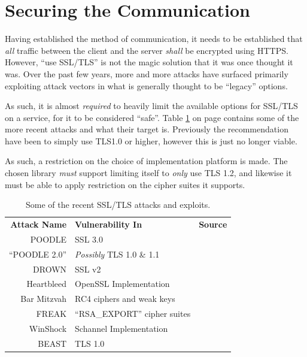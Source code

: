 	\section{Securing the Communication}
		\label{sec:design:secure-comms}
		Having established the method of communication, it needs to be established that \emph{all} traffic between the client and the server \emph{shall} be encrypted using HTTPS. However, ``use SSL/TLS'' is not the magic solution that it was once thought it was. Over the past few years, more and more attacks have surfaced primarily exploiting attack vectors in what is generally thought to be ``legacy'' options.

		As such, it is almost \emph{required} to heavily limit the available options for SSL/TLS on a service, for it to be considered ``safe''. Table \ref{table:ssl/tls} on page \pageref{table:ssl/tls} contains some of the more recent attacks and what their target is. Previously the recommendation have been to simply use TLS1.0 or higher\cite{ms_tls1.0+}, however this is just no longer viable. 

		As such, a restriction on the choice of implementation platform is made. The chosen library \emph{must} support limiting itself to \emph{only} use TLS 1.2, and likewise it must be able to apply restriction on the cipher suites it supports.

		\begin{table}
			\begin{tabular}{r | l | l}
				\textbf{Attack Name}	& \textbf{Vulnerability In}			& \textbf{Source} 						\\
				POODLE  				& SSL 3.0							& \cite{moller2014poodle}				\\
				``POODLE 2.0'' 			& \emph{Possibly} TLS 1.0 \& 1.1 	& \cite{poodlev2,poodlev2_2}			\\
				DROWN 					& SSL v2  							& \cite{aviramdrown}					\\
				Heartbleed 				& OpenSSL Implementation			& \cite{durumeric2014matter}			\\
				Bar Mitzvah 			& RC4 ciphers and weak keys 		& \cite{mantin2015barmitzvah}			\\
				FREAK 					& ``RSA\_EXPORT'' cipher suites 	& \cite[p.3]{novotnyimplementation}		\\
				WinShock 				& Schannel Implementation 			& \cite[p.2]{novotnyimplementation} 	\\
				BEAST 					& TLS 1.0 							& \cite{beast} 								\\
			\end{tabular}
			\caption{Some of the recent SSL/TLS attacks and exploits.}
			\label{table:ssl/tls}
		\end{table}


